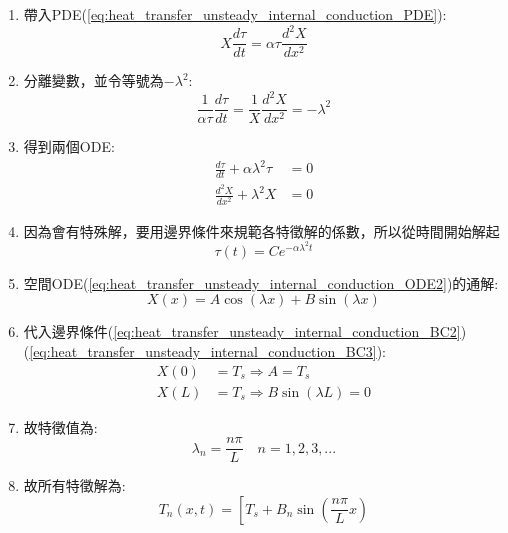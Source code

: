 \documentclass[../main.tex]{subfiles}
\begin{document}
\begin{itemize}
\begin{itemize}
\begin{enumerate}
\begin{equation}
        T(x,t) = X(x) \tau(t)
      \end{equation}
      \item 帶入PDE(\ref{eq:heat_transfer_unsteady_internal_conduction_PDE}):
      \begin{equation}
        X \frac{d\tau}{dt} = \alpha \tau \frac{d^2 X}{dx^2}
      \end{equation}
      \item 分離變數，並令等號為$-\lambda^2$:
      \begin{equation}
        \frac{1}{\alpha \tau} \frac{d\tau}{dt} = \frac{1}{X} \frac{d^2 X}{dx^2} = -\lambda^2
      \end{equation}
      \item 得到兩個ODE:
      \begin{align}
        \frac{d\tau}{dt} + \alpha \lambda^2 \tau &= 0 \label{eq:heat_transfer_unsteady_internal_conduction_ODE1}\\
        \frac{d^2 X}{dx^2} + \lambda^2 X &= 0 \label{eq:heat_transfer_unsteady_internal_conduction_ODE2}
      \end{align}
      \item 因為會有特殊解，要用邊界條件來規範各特徵解的係數，所以從時間開始解起
      \begin{equation}
        \tau(t) = C e^{-\alpha \lambda^2 t}
      \end{equation}
      \item 空間ODE(\ref{eq:heat_transfer_unsteady_internal_conduction_ODE2})的通解:
      \begin{equation}
        X(x) = A \cos (\lambda x) + B \sin (\lambda x)
      \end{equation}
      \item 代入邊界條件(\ref{eq:heat_transfer_unsteady_internal_conduction_BC2})(\ref{eq:heat_transfer_unsteady_internal_conduction_BC3}):
      \begin{align}
        X(0) &= T_s \Rightarrow A = T_s \\
        X(L) &= T_s \Rightarrow B \sin( \lambda L) = 0
      \end{align}
      \item 故特徵值為:
      \begin{equation}
        \lambda_n = \frac{n\pi}{L} \quad n=1,2,3,...
      \end{equation}
      \item 故所有特徵解為:
      \begin{equation}
        T_n(x,t) = \left[
          T_s + B_n \sin\left(\frac{n\pi}{L} x\right)

\end{equation}
\end{enumerate}
\end{itemize}
\end{itemize}
\end{document}
